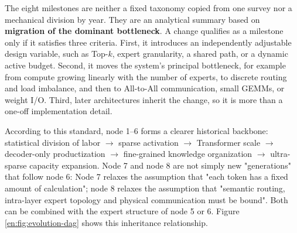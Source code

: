 \documentclass[10pt,a4paper,fontset=none]{ctexart}
\newcommand{\term}[1]{\textbf{#1}}
\begin{document}
The eight milestones are neither a fixed taxonomy copied from one survey nor a mechanical division by year. They are an analytical summary based on \term{migration of the dominant bottleneck}. A change qualifies as a milestone only if it satisfies three criteria. First, it introduces an independently adjustable design variable, such as Top-$k$, expert granularity, a shared path, or a dynamic active budget. Second, it moves the system's principal bottleneck, for example from compute growing linearly with the number of experts, to discrete routing and load imbalance, and then to All-to-All communication, small GEMMs, or weight I/O. Third, later architectures inherit the change, so it is more than a one-off implementation detail.

According to this standard, node 1--6 forms a clearer historical backbone: statistical division of labor $\rightarrow$ sparse activation $\rightarrow$ Transformer scale $\rightarrow$ decoder-only productization $\rightarrow$ fine-grained knowledge organization $\rightarrow$ ultra-sparse capacity expansion. Node 7 and node 8 are not simply new "generations" that follow node 6: Node 7 relaxes the assumption that "each token has a fixed amount of calculation"; node 8 relaxes the assumption that "semantic routing, intra-layer expert topology and physical communication must be bound". Both can be combined with the expert structure of node 5 or 6. Figure \ref{en:fig:evolution-dag} shows this inheritance relationship.
\end{document}
